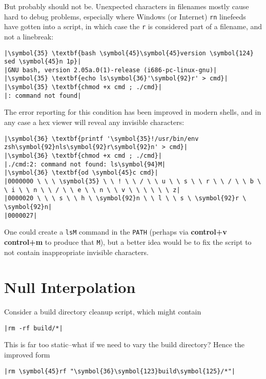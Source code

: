 \documentclass[10pt,a4paper]{article}
\begin{document}
But probably should not be. Unexpected characters in filenames mostly
cause hard to debug problems, especially where Windows (or Internet)
\texttt{rn} linefeeds have gotten into a script,
in which case the \texttt{r} is considered part of a
filename, and not a linebreak:

\begin{lstlisting}
|\symbol{35} \textbf{bash \symbol{45}\symbol{45}version \symbol{124} sed \symbol{45}n 1p}|
|GNU bash, version 2.05a.0(1)-release (i686-pc-linux-gnu)|
|\symbol{35} \textbf{echo ls\symbol{36}'\symbol{92}r' > cmd}|
|\symbol{35} \textbf{chmod +x cmd ; ./cmd}|
|: command not found|
\end{lstlisting}

The error reporting for this condition has been improved in modern
shells, and in any case a hex viewer will reveal any invisible
characters:

\begin{lstlisting}
|\symbol{36} \textbf{printf '\symbol{35}!/usr/bin/env zsh\symbol{92}nls\symbol{92}r\symbol{92}n' > cmd}|
|\symbol{36} \textbf{chmod +x cmd ; ./cmd}|
|./cmd:2: command not found: ls\symbol{94}M|
|\symbol{36} \textbf{od \symbol{45}c cmd}|
|0000000 \ \ \ \symbol{35} \ \ ! \ \ / \ \ u \ \ s \ \ r \ \ / \ \ b \ \ i \ \ n \ \ / \ \ e \ \ n \ \ v \ \ \ \ \ \ z|
|0000020 \ \ \ s \ \ h \ \symbol{92}n \ \ l \ \ s \ \symbol{92}r \ \symbol{92}n|
|0000027|
\end{lstlisting}

One could create a \texttt{lsM} command in the \texttt{PATH}
(perhaps via \textbf{control+v} \textbf{control+m} to produce that
\texttt{M}), but a better idea would be to fix the script to
not contain inappropriate invisible characters.

\section*{Null Interpolation}

Consider a build directory cleanup script, which might contain

\begin{lstlisting}
|rm -rf build/*|
\end{lstlisting}

This is far too static--what if we need to vary the build directory?
Hence the improved form

\begin{lstlisting}
|rm \symbol{45}rf "\symbol{36}\symbol{123}build\symbol{125}/*"|
\end{lstlisting}
\end{document}
